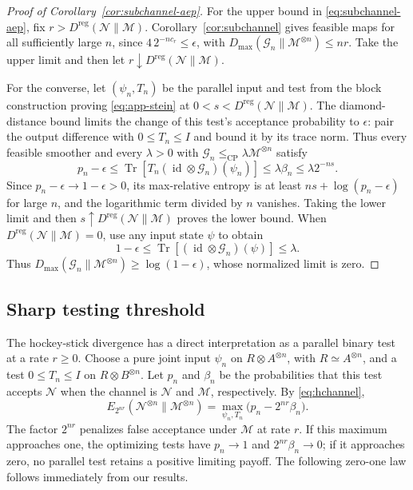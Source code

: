 \documentclass[11pt,letterpaper]{article}
\numberwithin{equation}{section}
\newcommand{\N}{\mathcal N}
\newcommand{\M}{\mathcal M}
\newcommand{\id}{\operatorname{id}}
\newcommand{\Tr}{\operatorname{Tr}}
\newcommand{\reg}{\mathrm{reg}}
\newcommand{\cp}{\mathrm{CP}}
\begin{document}
\begin{proof}[Proof of Corollary~\ref{cor:subchannel-aep}]
For the upper bound in \eqref{eq:subchannel-aep}, fix $r>D^{\reg}(\N\|\M)$. Corollary~\ref{cor:subchannel} gives feasible maps for all sufficiently large $n$, since $4\,2^{-nc_r}\le\epsilon$, with $D_{\max}(\mathcal G_n\|\M^{\otimes n})\le nr$. Take the upper limit and then let $r\downarrow D^{\reg}(\N\|\M)$.

For the converse, let $(\psi_n,T_n)$ be the parallel input and test from the block construction proving \eqref{eq:app-stein} at $0<s<D^{\reg}(\N\|\M)$. The diamond-distance bound limits the change of this test's acceptance probability to $\epsilon$: pair the output difference with $0\le T_n\le I$ and bound it by its trace norm. Thus every feasible smoother and every $\lambda>0$ with $\mathcal G_n\le_{\cp}\lambda\M^{\otimes n}$ satisfy
\[
 p_n-\epsilon
 \le\Tr[T_n(\id\otimes\mathcal G_n)(\psi_n)]
 \le\lambda\beta_n\le\lambda2^{-ns}.
\]
Since $p_n-\epsilon\to1-\epsilon>0$, its max-relative entropy is at least $ns+\log(p_n-\epsilon)$ for large $n$, and the logarithmic term divided by $n$ vanishes. Taking the lower limit and then $s\uparrow D^{\reg}(\N\|\M)$ proves the lower bound. When $D^{\reg}(\N\|\M)=0$, use any input state $\psi$ to obtain
\[
 1-\epsilon\le\Tr[(\id\otimes\mathcal G_n)(\psi)]\le\lambda.
\]
Thus $D_{\max}(\mathcal G_n\|\M^{\otimes n})\ge\log(1-\epsilon)$, whose normalized limit is zero.
\end{proof}



\subsection{Sharp testing threshold}
The hockey-stick divergence has a direct interpretation as a parallel binary test at a rate $r\ge0$. Choose a pure joint input $\psi_n$ on $R\otimes A^{\otimes n}$, with $R\simeq A^{\otimes n}$, and a test $0\le T_n\le I$ on $R\otimes B^{\otimes n}$. Let $p_n$ and $\beta_n$ be the probabilities that this test accepts $\N$ when the channel is $\N$ and $\M$, respectively. By \eqref{eq:hchannel},
\[
 E_{2^{nr}}(\N^{\otimes n}\|\M^{\otimes n})
 =\max_{\psi_n,T_n}\bigl(p_n-2^{nr}\beta_n\bigr).
\]
The factor $2^{nr}$ penalizes false acceptance under $\M$ at rate $r$. If this maximum approaches one, the optimizing tests have $p_n\to1$ and $2^{nr}\beta_n\to0$; if it approaches zero, no parallel test retains a positive limiting payoff. The following zero-one law follows immediately from our results.
\end{document}
